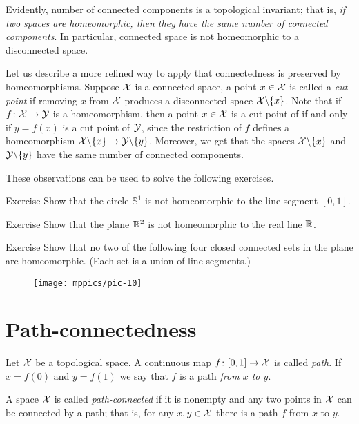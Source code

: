 Evidently, number of connected components is a topological invariant;
that is, \textit{if two spaces are homeomorphic, then they have the same number of connected components}.
In particular, connected space is not homeomorphic to a disconnected space.

Let us describe a more refined way to apply that connectedness is preserved by
homeomorphisms.
Suppose $\mathcal{X}$ is a connected space, a point $x \in\mathcal{X}$ is called a \emph{cut point} if removing $x$ from $\mathcal{X}$ produces a disconnected space $\mathcal{X}\backslash\{x\}$.
Note that if $f\colon\mathcal{X}\to \mathcal{Y}$ is a homeomorphism, then a point $x \in\mathcal{X}$ is a cut point of if and only if $y=f(x)$ is a cut point of $\mathcal{Y}$, since the restriction of $f$ defines a homeomorphism $\mathcal{X}\backslash\{x\}\to \mathcal{Y}\backslash\{y\}$.
Moreover, we get that the spaces $\mathcal{X}\backslash\{x\}$ and $\mathcal{Y}\backslash\{y\}$ have the same number of connected components.

These observations can be used to solve the following exercises.

\begin{thm}{Exercise}
Show that the circle $\mathbb{S}^1$ is not homeomorphic to the line segment $[0,1]$.
\end{thm}

\begin{thm}{Exercise}
Show that the plane $\mathbb{R}^2$ is not homeomorphic to the real line $\mathbb{R}$.
\end{thm}

\begin{thm}{Exercise}
Show that no two of the following four closed connected sets in the plane are homeomorphic.
(Each set is a union of line segments.)

\begin{figure}[!ht]
\centering
\texttt{[image: mppics/pic-10]}
\end{figure}

\end{thm}


\section{Path-connectedness}

Let $\mathcal{X}$ be a topological space.
A continuous map $f\colon[0,1]\to \mathcal{X}$ is called \emph{path}.
If $x=f(0)$ and $y=f(1)$ we say that $f$ is a path \emph{from $x$ to $y$}.

A space $\mathcal{X}$ is called \emph{path-connected} if it is nonempty and any two points in $\mathcal{X}$ can be connected by a path;
that is, for any $x,y\in \mathcal{X}$ there is a path $f$ from $x$ to $y$.

